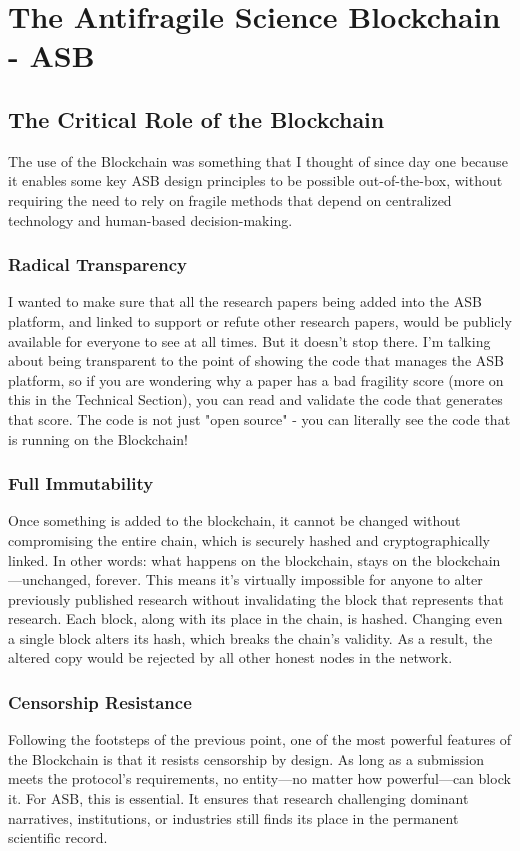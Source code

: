 \documentclass{article}
\begin{document}
\section{The Antifragile Science Blockchain - ASB}

\subsection{The Critical Role of the Blockchain}
The use of the Blockchain was something that I thought of since day one because it enables some key ASB design principles to be possible out-of-the-box, without requiring the need to rely on fragile methods that depend on centralized technology and human-based decision-making.

\subsubsection{Radical Transparency}
I wanted to make sure that all the research papers being added into the ASB platform, and linked to support or refute other research papers, would be publicly available for everyone to see at all times. But it doesn't stop there. I'm talking about being transparent to the point of showing the code that manages the ASB platform, so if you are wondering why a paper has a bad fragility score (more on this in the Technical Section), you can read and validate the code that generates that score. The code is not just "open source" - you can literally see the code that is running on the Blockchain!

\subsubsection{Full Immutability}
Once something is added to the blockchain, it cannot be changed without compromising the entire chain, which is securely hashed and cryptographically linked. In other words: what happens on the blockchain, stays on the blockchain—unchanged, forever. This means it's virtually impossible for anyone to alter previously published research without invalidating the block that represents that research. Each block, along with its place in the chain, is hashed. Changing even a single block alters its hash, which breaks the chain's validity. As a result, the altered copy would be rejected by all other honest nodes in the network.

\subsubsection{Censorship Resistance}
Following the footsteps of the previous point, one of the most powerful features of the Blockchain is that it resists censorship by design. As long as a submission meets the protocol’s requirements, no entity—no matter how powerful—can block it. For ASB, this is essential. It ensures that research challenging dominant narratives, institutions, or industries still finds its place in the permanent scientific record.
\end{document}
